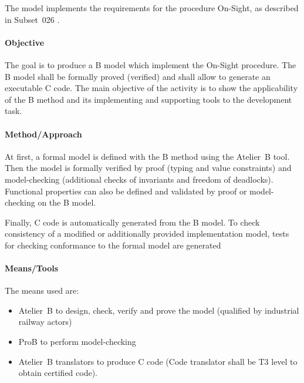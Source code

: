 The model implements the requirements for the procedure On-Sight, as
described in Subset~026 \cite[Sec.~5]{subset-026:3.3.0}.



\paragraph{Objective}


The goal is to produce a B model which implement the On-Sight
procedure.  The B model shall be formally proved (verified) and shall
allow to generate an executable C code. The main objective of the
activity is to show the applicability of the B method and its
implementing and supporting tools to the development task.



\paragraph{Method/Approach}

At first, a formal model is defined with the B method using the
Atelier~B tool.  Then the model is formally verified by proof (typing
and value constraints) and model-checking (additional checks of
invariants and freedom of deadlocks).  Functional properties can also
be defined and validated by proof or model-checking on the B model.

Finally, C code is automatically generated from the B model. To check
consistency of a modified or additionally provided implementation
model, tests for checking conformance to the formal model are generated

\paragraph{Means/Tools}


The means used are:
\begin{itemize}
\item Atelier~B to  design, check, verify and prove the model (qualified by industrial railway actors)
\item ProB to perform model-checking
\item Atelier~B translators to produce C code (Code translator shall be T3 level to obtain certified code).
\end{itemize}


